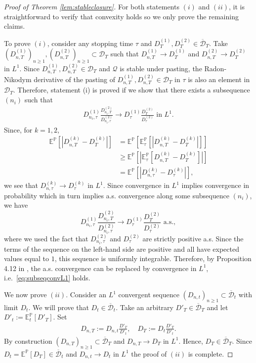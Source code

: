 \documentclass[11pt,a4paper]{article}
\newcommand{\E}{\mathbb{E}}
\renewcommand{\P}{\mathbb{P}}
\newcommand{\calQ}{\mathcal{Q}}
\newcommand{\calD}{\mathcal{D}}
\begin{document}
\begin{proof}[Proof of Theorem \ref{lem:stableclosure}]
For both statements $(i)$ and $(ii)$, it is straightforward to verify that convexity holds so we only prove the remaining claims. 

To prove $(i)$, consider any stopping time $\tau$ and $D^{(1)}_T,D^{(2)}_T\in \overline{\calD}_T$. Take $(D^{(1)}_{n,T})_{n\geq 1},(D^{(2)}_{n,T})_{n\geq 1}\subset \calD_T$ such that $D^{(1)}_{n,T}\to D^{(1)}_T$ and $D^{(2)}_{n,T}\to D^{(2)}_T$ in $L^1$. 
Since $D^{(1)}_{n,T},D^{(2)}_{n,T}\in \calD_T$ and $\calQ$ is stable under pasting, the Radon-Nikodym derivative of the pasting of $D^{(1)}_{n,T},D^{(2)}_{n,T}\in \calD_T$ in $\tau$ is also an element in $\calD_T$. Therefore, statement (i) is proved if we show that there exists a subsequence $(n_i)$ such that 
\begin{align}\label{eq:subseqconvL1}
D^{(1)}_{n_i,\tau}\frac{D^{(2)}_{n_i,T}}{D^{(2)}_{n_i,\tau}} \to D^{(1)}_{\tau}\frac{D^{(2)}_T}{D^{(2)}_{\tau}}
\text{ in } L^1. 
\end{align}
Since, for $k=1,2$, 
\begin{align*}
\E^{\P}[|D^{(k)}_{n,T}-D^{(k)}_{T}|]&=\E^{\P}[\E^{\P}_\tau[|D^{(k)}_{n,T} - D^{(k)}_{T}|]]\\
&\geq \E^{\P}[|\E^{\P}_{\tau}[D^{(k)}_{n,T} - D^{(k)}_{T}]|]\\
&=\E^{\P}[|D^{(k)}_{n,\tau} - D^{(k)}_{\tau}|], 
\end{align*}
we see that $D^{(k)}_{n,\tau}\to D^{(k)}_{\tau}$ in $L^1$. Since convergence in $L^1$ implies convergence in probability which in turn implies a.s. convergence along some subsequence $(n_i)$, we have 
$$
D^{(1)}_{n_i,\tau}\frac{D^{(2)}_{n_i,T}}{D^{(2)}_{n_i,\tau}} \to D^{(1)}_{\tau}\frac{D^{(2)}_T}{D^{(2)}_{\tau}}
\text{ a.s.}, 
$$ 
where we used the fact that $D^{(2)}_{n_i,\tau}$ and $D^{(2)}_{\tau}$ are strictly positive a.s. Since the terms of the sequence on the left-hand side are positive and all have expected values equal to $1$, this sequence is uniformly integrable. Therefore, by Proposition 4.12 in \cite{Kallenberg-02}, the a.s. convergence can be replaced by convergence in $L^1$, i.e.~\eqref{eq:subseqconvL1} holds.   

We now prove $(ii)$. Consider an $L^1$ convergent sequence $(D_{n,t})_{n\geq 1}\subset \overline{\calD}_t$ with limit $D_t$. We will prove that $D_t\in \overline{\calD}_t$. 
Take an arbitrary $D'_T\in \overline{\calD}_T$ and let $D'_t:=\E^{\P}_t[D'_T]$. Set 
\begin{align*}
D_{n,T}:=D_{n,t}\frac{D'_T}{D'_t}, \quad D_{T}:=D_{t}\frac{D'_T}{D'_t}.
\end{align*}
By construction $(D_{n,T})_{n\geq 1}\subset \overline{\calD}_T$ and $D_{n,T}\to D_T$ in $L^1$. Hence, $D_T\in \overline{\calD}_T$. Since $D_t=\E^{\P}[D_T]\in \overline{\calD}_t$ and $D_{n,t}\to D_t$ in $L^1$ the proof of $(ii)$ is complete. 


\end{proof}
\end{document}
